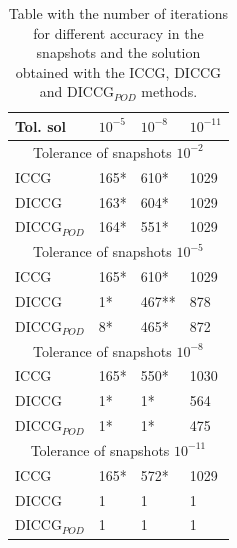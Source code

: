 \documentclass{ecmorXV}
\begin{document}
\begin{table}[h!]
\centering
\begin{tabular}{ |p{2.5cm}|p{1.5cm}|p{1.5cm}|p{1.5cm}|} 
\hline
Tol. sol& $10^{-5}$ & $10^{-8}$ & $10^{-11}$ \\ 
\hline
  \multicolumn{4}{|c|}{Tolerance of snapshots $10^{-2}$} \\
  \hline
   ICCG        &165* &  610*& 1029\\
         DICCG  & 163*& 604* &1029 \\
    DICCG$_{POD}$& 164*& 551* &1029 \\
   \hline
     \multicolumn{4}{|c|}{Tolerance of snapshots $10^{-5}$} \\
  \hline
   ICCG&165* &  610*& 1029\\
         DICCG& 1*& 467** &878 \\
DICCG$_{POD}$& 8*& 465* &872 \\
   \hline
        \multicolumn{4}{|c|}{Tolerance of snapshots $10^{-8}$} \\
  \hline
   ICCG&165* &  550*& 1030\\
         DICCG& 1*& 1* &564 \\
         DICCG$_{POD}$& 1*& 1* &475 \\
  \hline

           \multicolumn{4}{|c|}{Tolerance of snapshots $10^{-11}$} \\
  \hline
   ICCG&165* &  572*& 1029\\
         DICCG& 1& 1 &1 \\
         DICCG$_{POD}$& 1& 1 &1 \\
  \hline

\end{tabular}
\caption{Table with the number of iterations for different accuracy in the snapshots and the solution obtained with the ICCG, DICCG and DICCG$_{POD}$ methods.}
\label{table:spe10}
\end{table}
\end{document}
